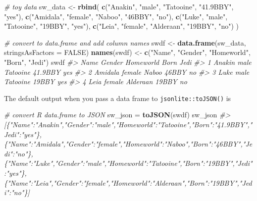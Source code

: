 \documentclass[
]{book}
\newenvironment{Shaded}{\begin{snugshade}}{\end{snugshade}}
\newcommand{\AttributeTok}[1]{\textcolor[rgb]{0.13,0.29,0.53}{#1}}
\newcommand{\CommentTok}[1]{\textcolor[rgb]{0.56,0.35,0.01}{\textit{#1}}}
\newcommand{\ConstantTok}[1]{\textcolor[rgb]{0.56,0.35,0.01}{#1}}
\newcommand{\FunctionTok}[1]{\textcolor[rgb]{0.13,0.29,0.53}{\textbf{#1}}}
\newcommand{\NormalTok}[1]{#1}
\newcommand{\OtherTok}[1]{\textcolor[rgb]{0.56,0.35,0.01}{#1}}
\newcommand{\StringTok}[1]{\textcolor[rgb]{0.31,0.60,0.02}{#1}}
\begin{document}
\begin{Shaded}
\begin{Highlighting}[]
\CommentTok{\# toy data}
\NormalTok{sw\_data }\OtherTok{\textless{}{-}} \FunctionTok{rbind}\NormalTok{(}
  \FunctionTok{c}\NormalTok{(}\StringTok{"Anakin"}\NormalTok{, }\StringTok{"male"}\NormalTok{, }\StringTok{"Tatooine"}\NormalTok{, }\StringTok{"41.9BBY"}\NormalTok{,  }\StringTok{"yes"}\NormalTok{),  }
  \FunctionTok{c}\NormalTok{(}\StringTok{"Amidala"}\NormalTok{, }\StringTok{"female"}\NormalTok{, }\StringTok{"Naboo"}\NormalTok{, }\StringTok{"46BBY"}\NormalTok{, }\StringTok{"no"}\NormalTok{),}
  \FunctionTok{c}\NormalTok{(}\StringTok{"Luke"}\NormalTok{, }\StringTok{"male"}\NormalTok{, }\StringTok{"Tatooine"}\NormalTok{, }\StringTok{"19BBY"}\NormalTok{, }\StringTok{"yes"}\NormalTok{),}
  \FunctionTok{c}\NormalTok{(}\StringTok{"Leia"}\NormalTok{, }\StringTok{"female"}\NormalTok{, }\StringTok{"Alderaan"}\NormalTok{, }\StringTok{"19BBY"}\NormalTok{, }\StringTok{"no"}\NormalTok{)}
\NormalTok{)}

\CommentTok{\# convert to data.frame and add column names}
\NormalTok{swdf }\OtherTok{\textless{}{-}} \FunctionTok{data.frame}\NormalTok{(sw\_data, }\AttributeTok{stringsAsFactors =} \ConstantTok{FALSE}\NormalTok{)}
\FunctionTok{names}\NormalTok{(swdf) }\OtherTok{\textless{}{-}} \FunctionTok{c}\NormalTok{(}\StringTok{"Name"}\NormalTok{, }\StringTok{"Gender"}\NormalTok{, }\StringTok{"Homeworld"}\NormalTok{, }\StringTok{"Born"}\NormalTok{, }\StringTok{"Jedi"}\NormalTok{)}
\NormalTok{swdf}
\CommentTok{\#\textgreater{}      Name Gender Homeworld    Born Jedi}
\CommentTok{\#\textgreater{} 1  Anakin   male  Tatooine 41.9BBY  yes}
\CommentTok{\#\textgreater{} 2 Amidala female     Naboo   46BBY   no}
\CommentTok{\#\textgreater{} 3    Luke   male  Tatooine   19BBY  yes}
\CommentTok{\#\textgreater{} 4    Leia female  Alderaan   19BBY   no}
\end{Highlighting}
\end{Shaded}

The default output when you pass a data frame to \texttt{jsonlite::toJSON()} is

\begin{Shaded}
\begin{Highlighting}[]
\CommentTok{\# convert R data.frame to JSON}
\NormalTok{sw\_json }\OtherTok{=} \FunctionTok{toJSON}\NormalTok{(swdf)}
\NormalTok{sw\_json}
\CommentTok{\#\textgreater{} [\{"Name":"Anakin","Gender":"male","Homeworld":"Tatooine","Born":"41.9BBY","Jedi":"yes"\},\{"Name":"Amidala","Gender":"female","Homeworld":"Naboo","Born":"46BBY","Jedi":"no"\},\{"Name":"Luke","Gender":"male","Homeworld":"Tatooine","Born":"19BBY","Jedi":"yes"\},\{"Name":"Leia","Gender":"female","Homeworld":"Alderaan","Born":"19BBY","Jedi":"no"\}]}
\end{Highlighting}
\end{Shaded}
\end{document}
